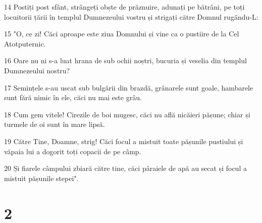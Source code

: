 \par 14 Postiți post sfânt, strângeți obște de prăznuire, adunați pe bătrâni, pe toți locuitorii țării în templul Dumnezeului vostru și strigați către Domnul rugându-L:
\par 15 "O, ce zi! Căci aproape este ziua Domnului și vine ca o pustiire de la Cel Atotputernic.
\par 16 Oare nu ni s-a luat hrana de sub ochii noștri, bucuria și veselia din templul Dumnezeului nostru?
\par 17 Semințele s-au uscat sub bulgării din brazdă, grânarele sunt goale, hambarele sunt fără nimic în ele, căci nu mai este grâu.
\par 18 Cum gem vitele! Cirezile de boi mugesc, căci nu află nicăieri pășune; chiar și turmele de oi sunt în mare lipsă.
\par 19 Către Tine, Doamne, strig! Căci focul a mistuit toate pășunile pustiului și văpaia lui a dogorit toți copacii de pe câmp.
\par 20 Și fiarele câmpului zbiară către tine, căci pâraiele de apă au secat și focul a mistuit pășunile stepei".

\chapter{2}

